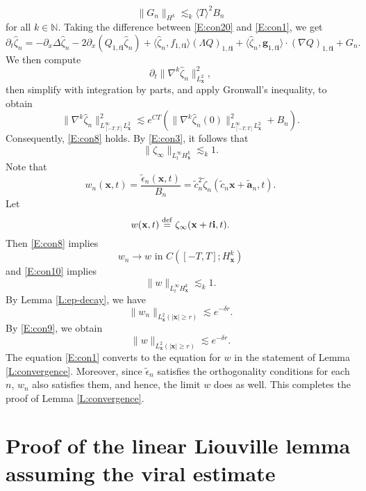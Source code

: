 \documentclass[12pt,letterpaper]{amsart}
\newcommand{\la}{\langle}
\newcommand{\ra}{\rangle}
\newcommand{\defeq}{\stackrel{\rm{def}}{=}}
\theoremstyle{remark}
\numberwithin{equation}{section}
\numberwithin{theorem}{section}
\numberwithin{table}{section}
\begin{document}
$$\|G_n \|_{H^k} \lesssim_k \la T \ra^2 B_n $$
for all $k\in \mathbb{N}$.    Taking the difference between \eqref{E:con20} and \eqref{E:con1}, we get
\begin{equation}
\label{E:con21}
\partial_t  \hat \zeta_n = - \partial_x \Delta  \hat \zeta_n - 2 \partial_x ( Q_{1,t\mathbf{i}}  \hat \zeta_n) + \la  \hat \zeta_n, f_{1,t\mathbf{i}} \ra (\Lambda Q)_{1,t\mathbf{i}} +  \la  \hat \zeta_n, \mathbf{g}_{1,t\mathbf{i}} \ra \cdot (\nabla Q)_{1, t \mathbf{i}} + G_n.
\end{equation}
We then compute
$$
\partial_t \| \nabla^k \hat \zeta_n \|_{L^2_{\mathbf{x}}}^2,
$$
then simplify with integration by parts, and apply Gronwall's inequality, to obtain
$$
\| \nabla^k \hat \zeta_n \|_{L_{[-T,T]}^\infty L^2_{\mathbf{x}}}^2 \lesssim e^{CT} (\| \nabla^k \hat \zeta_n(0) \|_{L_{[-T,T]}^\infty L^2_{\mathbf{x}}}^2+ B_n).
$$
Consequently, \eqref{E:con8} holds.  By \eqref{E:con3}, it follows that
\begin{equation}
\label{E:con10}
\| \zeta_\infty \|_{L_t^\infty H_{\mathbf{x}}^k} \lesssim_k 1.
\end{equation}
Note that
$$
w_n(\mathbf{x},t) = \frac{\tilde \epsilon_n(\mathbf{x},t)}{B_n}  = \tilde c_n^2 \tilde \zeta_n( \tilde c_n\mathbf{x}+ \tilde{\mathbf{a}}_n, t).
$$
Let
$$w(\mathbf{x},t) \defeq \zeta_\infty(\mathbf{x}+t \mathbf{i},t).$$
Then \eqref{E:con8} implies 
\begin{equation}
\label{E:con9}
w_n \to w \text{ in } C([-T,T]; H_{\mathbf{x}}^k)
\end{equation}
and \eqref{E:con10} implies
\begin{equation}
\label{E:con11}
\|w \|_{L_t^\infty H_{\mathbf{x}}^k} \lesssim_k 1.
\end{equation}
By Lemma \ref{L:ep-decay}, we have
$$
\| w_n \|_{L_{\mathbf{x}}^2(|\mathbf{x}| \geq r)} \lesssim e^{-\delta r}.
$$
By \eqref{E:con9}, we obtain
$$
\| w \|_{L_{\mathbf{x}}^2(|\mathbf{x}| \geq r)} \lesssim e^{-\delta r}.
$$
The equation \eqref{E:con1} converts to the equation for $w$ in the statement of Lemma \ref{L:convergence}.  Moreover, since $\tilde \epsilon_n$ satisfies the orthogonality conditions for each $n$, $w_n$ also satisfies them, and hence, the limit $w$ does as well.  This completes the proof of Lemma \ref{L:convergence}.  

\section{Proof of the linear Liouville lemma assuming the viral estimate}
\label{S:linear-Liouville}
\end{document}
